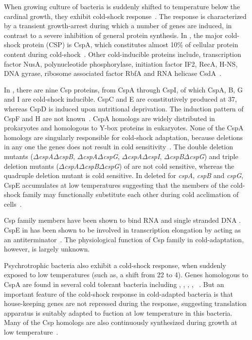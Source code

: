 When growing culture of bacteria is suddenly shifted to
temperature below the cardinal growth, they exhibit cold-shock
response~\citep{Jones1987}. The response is characterized by a
transient growth-arrest during which a number of genes are
induced, in contrast to a severe inhibition of general protein
synthesis. In , the major cold-shock protein (CSP) is
CspA, which constitutes almost 10\% of cellular protein content
during cold-shock~\citep{Goldstein1990}. Other cold-inducible
proteins include, transcription factor NusA, polynucleotide
phosphorylase, initiation factor IF2, RecA, H-NS, DNA gyrase,
ribosome associated factor RbfA and RNA helicase
CsdA~\citep[reviewed in][]{Yamanaka1999}.

In , there are nine Csp proteins, from CspA through CspI,
of which CspA, B, G and I are cold-shock inducible. CspC and E are
constitutively produced at 37\dg{}, whereas CspD is induced upon
nutritional deprivation. The induction pattern of CspF and H are
not known~\citep[reviewed in][]{Phadtare1999a}. CspA homologs are
widely distributed in prokaryotes and homologous to Y-box proteins
in eukaryotes. None of the CspA homologs are singularly
responsible for cold-shock adaptation, because deletions in any
one the  genes does not result in cold
sensitivity~\citep{Xia2001}. The double deletion mutants
($\Delta$\emph{cspA}$\Delta$\emph{cspB},
$\Delta$\emph{cspA}$\Delta$\emph{cspG},
$\Delta$\emph{cspA}$\Delta$\emph{cspI},
$\Delta$\emph{cspB}$\Delta$\emph{cspG}) and triple deletion
mutants
($\Delta$\emph{cspA}$\Delta$\emph{cspB}$\Delta$\emph{cspG}) of
 are not cold sensitive, whereas the quadruple deletion
mutant is cold sensitive. In  deleted for \emph{cspA},
\emph{cspB} and \emph{cspG}, CspE accumulates at low temperatures
suggesting that the members of the cold-shock family may
functionally substitute each other during cold acclimation of
cells~\citep{Xia2001}.

Csp family members have been shown to bind RNA and single stranded
DNA \citep{Phadtare1999}. CspE in  has been shown to be
involved in transcription elongation by acting as an
antiterminator~\citep{Phadtare2002}. The physiological function of
Csp family in cold-adaptation, however, is largely unknown.

Psychrotrophic bacteria also exhibit a cold-shock response, when
suddenly exposed to low temperatures (such as, a shift from 22 to
4\dg{}). Genes homologous to CspA are found in several cold
tolerant bacteria including  \citep{Ray1994},
, , ,
~\citep{Hebraud1999}. But an important
feature of the cold-shock response in cold-adapted bacteria is
that house-keeping genes are not repressed during the response,
suggesting translation apparatus is suitably adapted to fuction at
low temperature in this bacteria. Many of the Csp homologs are
also continuously synthesized during growth at low
temperature~\citep{Hebraud1999}.

